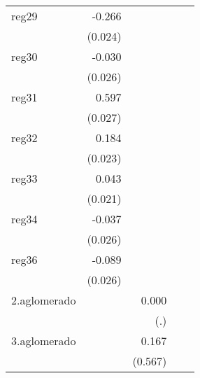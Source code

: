 {\begin{longtable}{l*{4}{D{.}{.}{-1}}}
\addlinespace
reg29       &      -0.266\sym{***}&                     &                     &                     \\
            &     (0.024)         &                     &                     &                     \\
\addlinespace
reg30       &      -0.030         &                     &                     &                     \\
            &     (0.026)         &                     &                     &                     \\
\addlinespace
reg31       &       0.597\sym{***}&                     &                     &                     \\
            &     (0.027)         &                     &                     &                     \\
\addlinespace
reg32       &       0.184\sym{***}&                     &                     &                     \\
            &     (0.023)         &                     &                     &                     \\
\addlinespace
reg33       &       0.043\sym{*}  &                     &                     &                     \\
            &     (0.021)         &                     &                     &                     \\
\addlinespace
reg34       &      -0.037         &                     &                     &                     \\
            &     (0.026)         &                     &                     &                     \\
\addlinespace
reg36       &      -0.089\sym{***}&                     &                     &                     \\
            &     (0.026)         &                     &                     &                     \\
\addlinespace
2.aglomerado&                     &       0.000         &                     &                     \\
            &                     &         (.)         &                     &                     \\
\addlinespace
3.aglomerado&                     &       0.167         &                     &                     \\
            &                     &     (0.567)         &                     &                     \\

\end{longtable}}
